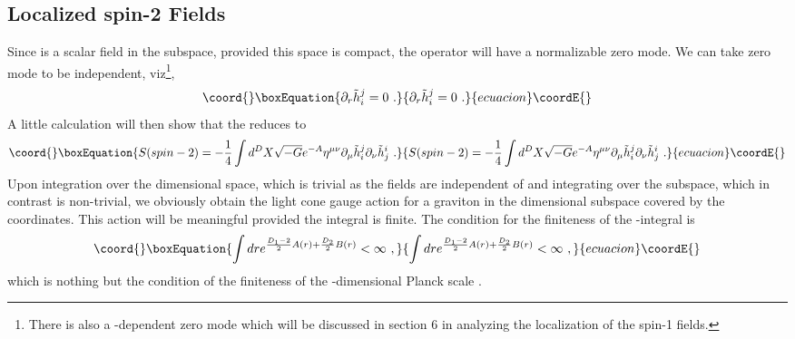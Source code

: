 \documentclass[a4paper,12pt]{article}
\begin{document}
\subsection{Localized spin-2 Fields}
Since \coordHE{} is a scalar field in the \coordHE{} subspace,
provided this space is compact, the operator \coordHE{} will have a
normalizable zero mode.  We can take zero mode to be \coordHE{} independent,
viz\footnote{There is also a \coordHE{}-dependent zero mode which will be
discussed in section 6 in analyzing the localization of the spin-1
fields.},
\begin{equation}\coord{}\boxEquation{
\partial_r \tilde h_i ^{j} =0~.
}{
\partial_r \tilde h_i ^{j} =0~.
}{ecuacion}\coordE{}\end{equation}
A little calculation will then show that the \coordHE{} reduces to
\begin{equation}\coord{}\boxEquation{
S(spin-2)= -\frac{1}{4}\int d^D X \sqrt{-G}e^{-A}\eta^{\mu\nu}
\partial_\mu
\tilde h_i^j\partial_{\nu} \tilde h^i_j~.
\label{spin2z}
}{
S(spin-2)= -\frac{1}{4}\int d^D X \sqrt{-G}e^{-A}\eta^{\mu\nu}
\partial_\mu
\tilde h_i^j\partial_{\nu} \tilde h^i_j~.
}{ecuacion}\coordE{}\end{equation}
Upon integration over the \coordHE{} dimensional \coordHE{} space, which is
trivial as the fields are independent of \coordHE{} and integrating over the
\coordHE{} subspace, which in contrast is non-trivial, we obviously obtain
the light cone gauge action for a graviton in the \coordHE{} dimensional
subspace covered by the \coordHE{} coordinates. This action will be
meaningful provided the \coordHE{} integral is finite. The condition for the
finiteness of the \coordHE{}-integral is
\begin{equation}\coord{}\boxEquation{
\int dr e^{\frac{D_1-2}{2} A(r)+ \frac{D_2}{2}B(r) }<\infty~,
}{
\int dr e^{\frac{D_1-2}{2} A(r)+ \frac{D_2}{2}B(r) }<\infty~,
}{ecuacion}\coordE{}\end{equation}
which is nothing but the condition of the finiteness of the
\coordHE{}-dimensional Planck scale \cite{Randall:1999vf}.
\end{document}
